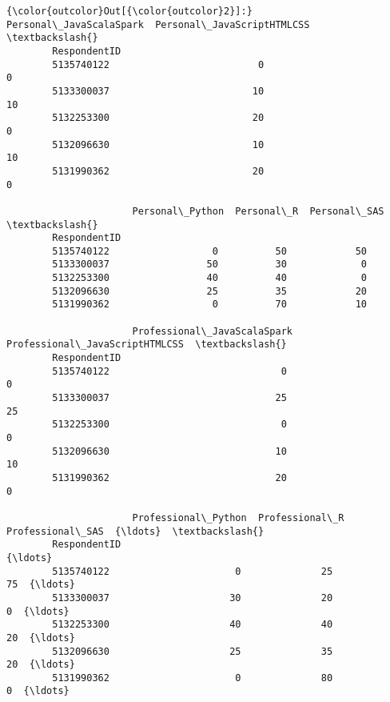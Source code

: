 \documentclass[11pt]{article}
\begin{document}
\begin{Verbatim}[commandchars=\\\{\}]
{\color{outcolor}Out[{\color{outcolor}2}]:}               Personal\_JavaScalaSpark  Personal\_JavaScriptHTMLCSS  \textbackslash{}
        RespondentID                                                        
        5135740122                          0                           0   
        5133300037                         10                          10   
        5132253300                         20                           0   
        5132096630                         10                          10   
        5131990362                         20                           0   
        
                      Personal\_Python  Personal\_R  Personal\_SAS  \textbackslash{}
        RespondentID                                              
        5135740122                  0          50            50   
        5133300037                 50          30             0   
        5132253300                 40          40             0   
        5132096630                 25          35            20   
        5131990362                  0          70            10   
        
                      Professional\_JavaScalaSpark  Professional\_JavaScriptHTMLCSS  \textbackslash{}
        RespondentID                                                                
        5135740122                              0                               0   
        5133300037                             25                              25   
        5132253300                              0                               0   
        5132096630                             10                              10   
        5131990362                             20                               0   
        
                      Professional\_Python  Professional\_R  Professional\_SAS  {\ldots}  \textbackslash{}
        RespondentID                                                         {\ldots}   
        5135740122                      0              25                75  {\ldots}   
        5133300037                     30              20                 0  {\ldots}   
        5132253300                     40              40                20  {\ldots}   
        5132096630                     25              35                20  {\ldots}   
        5131990362                      0              80                 0  {\ldots}   
        

\end{Verbatim}
\end{document}
